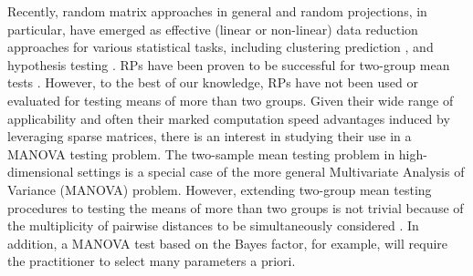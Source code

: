 \documentclass[APA,Times1COL]{WileyNJDv5} %
\begin{document}
Recently, random matrix approaches in general and random projections, in particular, have emerged as effective (linear or non-linear) data reduction approaches for various statistical tasks, including clustering \citep{vrahatis2020ensemble,wan2020sharp} prediction \citep{Mukhopadhyay2020targeted}, and hypothesis testing \citep{lopes2011more,srivastava2014raptt,zoh2018powerful}. RPs have been proven to be successful for two-group mean tests \citep{lopes2011more,srivastava2014raptt,zoh2018powerful}. However, to the best of our knowledge, RPs have not been used or evaluated for testing means of more than two groups. Given their wide range of applicability and often their marked computation speed advantages induced by leveraging sparse matrices, there is an interest in studying their use in a MANOVA testing problem. The two-sample mean testing problem in high-dimensional settings is a special case of the more general Multivariate Analysis of Variance (MANOVA) problem. However, extending two-group mean testing procedures to testing the means of more than two groups is not trivial because of the multiplicity of pairwise distances to be simultaneously considered \citep{cai2014high}. In addition, a MANOVA test based on the Bayes factor, for example, will require the practitioner to select many parameters a priori. 
\end{document}
